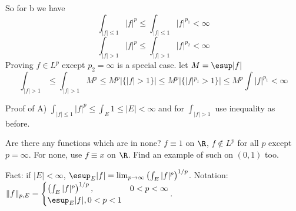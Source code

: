 So for b we have
	\[
	\int_{|f| \leq 1} |f|^p \leq \int_{|f| \leq 1} |f|^{p_1} < \infty
	\]
	\[
	\int_{|f|>1} |f|^p \leq \int_{|f|>1} |f|^{p_2} < \infty
	\]
Proving $f \in L^p$ except $p_2=\infty$ is a special case. let $M= \esup |f|$ 
	\[
	\int_{|f|>1} \leq \int_{|f|>1} M^p \leq M^p |\{|f|>1\}| \leq M^p |\{|f|^{p_1}>1\}| \leq M^p \int |f|^{p_1} < \infty
	\]


Proof of A) $\int_{|f| \leq 1} |f|^p \leq \int_E 1 \leq |E|<\infty$ and for $\int_{|f|>1}$ use inequality as before. 




Are there any functions which are in none? $f \equiv 1$ on $\R$, $f \notin L^p$ for all $p$ except $p=\infty$. For none, use $f \equiv x$ on $\R$. Find an example of such on $(0,1)$ too. 




Fact: if $|E|<\infty$, $\esup_E |f|= \lim_{p \to \infty} \left( \int_E |f|^p\right)^{1/p}$. Notation: $\|f\|_{p,E}= \begin{cases} \left( \int_E |f|^p\right)^{1/p}, & 0<p<\infty \\ \esup_E |f|, 0<p<1 \end{cases}$. 




















